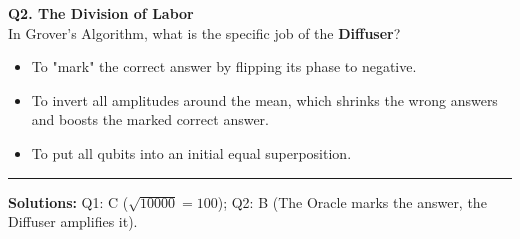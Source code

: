 \documentclass[a4paper,11pt]{article}
\begin{document}
\vspace{0.3cm}

\textbf{Q2. The Division of Labor}\\
In Grover's Algorithm, what is the specific job of the \textbf{Diffuser}?
\begin{itemize}
    \item[A)] To "mark" the correct answer by flipping its phase to negative.
    \item[B)] To invert all amplitudes around the mean, which shrinks the wrong answers and boosts the marked correct answer.
    \item[C)] To put all qubits into an initial equal superposition.
\end{itemize}

\vspace{1cm}
\hrule
\vspace{0.2cm}
\footnotesize{\textbf{Solutions:} Q1: C ($\sqrt{10000} = 100$); Q2: B (The Oracle marks the answer, the Diffuser amplifies it).}
\end{document}
